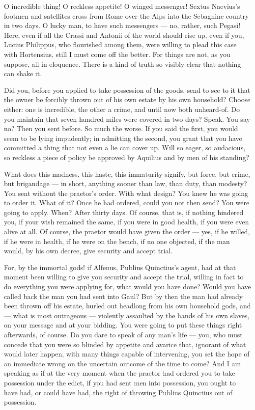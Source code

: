  O incredible thing! O reckless appetite! O winged messenger! Sextus Naevius's footmen and satellites cross from Rome over the Alps into the Sebagnine country in two days. O lucky man, to have such messengers --- no, rather, such Pegasi! Here, even if all the Crassi and Antonii of the world should rise up, even if you, Lucius Philippus, who flourished among them, were willing to plead this case with Hortensius, still I must come off the better. For things are not, as you suppose, all in eloquence. There is a kind of truth so visibly clear that nothing can shake it.

 Did you, before you applied to take possession of the goods, send to see to it that the owner be forcibly thrown out of his own estate by his own household? Choose either: one is incredible, the other a crime, and until now both unheard-of. Do you maintain that seven hundred miles were covered in two days? Speak. You say no? Then you sent before. So much the worse. If you said the first, you would seem to be lying impudently; in admitting the second, you grant that you have committed a thing that not even a lie can cover up. Will so eager, so audacious, so reckless a piece of policy be approved by Aquilius and by men of his standing?

 What does this madness, this haste, this immaturity signify, but force, but crime, but brigandage --- in short, anything sooner than law, than duty, than modesty? You sent without the praetor's order. With what design? You knew he was going to order it. What of it? Once he had ordered, could you not then send? You were going to apply. When? After thirty days. Of course, that is, if nothing hindered you, if your wish remained the same, if you were in good health, if you were even alive at all. Of course, the praetor would have given the order --- yes, if he willed, if he were in health, if he were on the bench, if no one objected, if the man would, by his own decree, give security and accept trial.

 For, by the immortal gods! if Alfenus, Publius Quinctius's agent, had at that moment been willing to give you security and accept the trial, willing in fact to do everything you were applying for, what would you have done? Would you have called back the man you had sent into Gaul? But by then the man had already been thrown off his estate, hurled out headlong from his own household gods, and --- what is most outrageous --- violently assaulted by the hands of his own slaves, on your message and at your bidding. You were going to put these things right afterwards, of course. Do you dare to speak of any man's life --- you, who must concede that you were so blinded by appetite and avarice that, ignorant of what would later happen, with many things capable of intervening, you set the hope of an immediate wrong on the uncertain outcome of the time to come? And I am speaking as if at the very moment when the praetor had ordered you to take possession under the edict, if you had sent men into possession, you ought to have had, or could have had, the right of throwing Publius Quinctius out of possession.

